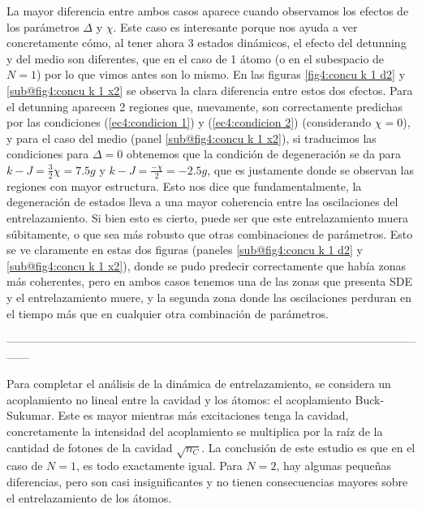 La mayor diferencia entre ambos casos aparece cuando observamos los efectos de los parámetros $\Delta$ y $\chi$. Este caso es interesante porque nos ayuda a ver concretamente cómo, al tener ahora 3 estados dinámicos, el efecto del detunning y del medio son diferentes, que en el caso de 1 átomo (o en el subespacio de $N=1$) por lo que vimos antes son lo mismo. En las figuras \ref{fig4:concu k 1 d2} y \ref{sub@fig4:concu k 1 x2} se observa la clara diferencia entre estos dos efectos. Para el detunning aparecen 2 regiones que, nuevamente, son correctamente predichas por las condiciones (\ref{ec4:condicion 1}) y (\ref{ec4:condicion 2}) (considerando $\chi=0$), y para el caso del medio (panel \ref{sub@fig4:concu k 1 x2}), si traducimos las condiciones para $\Delta=0$ obtenemos que la condición de degeneración se da para $k-J=\frac{3}{2}\chi=7.5g$ y $k-J=\frac{-\chi}{2}=-2.5g$, que es justamente donde se observan las regiones con mayor estructura.
Esto nos dice que fundamentalmente, la degeneración de estados lleva a una mayor coherencia entre las oscilaciones del entrelazamiento. Si bien esto es cierto, puede ser que este entrelazamiento muera súbitamente, o que sea más robusto que otras combinaciones de parámetros. Esto se ve claramente en estas dos figuras (paneles \ref{sub@fig4:concu k 1 d2} y \ref{sub@fig4:concu k 1 x2}), donde se pudo predecir correctamente que había zonas más coherentes, pero en ambos casos tenemos una de las zonas que presenta SDE y el entrelazamiento muere, y la segunda zona donde las oscilaciones perduran en el tiempo más que en cualquier otra combinación de parámetros. 

------------------------------------------------------------------------------------------------------------------



Para completar el análisis de la dinámica de entrelazamiento, se considera un acoplamiento no lineal entre la cavidad y los átomos: el acoplamiento Buck-Sukumar. Este es mayor mientras más excitaciones tenga la cavidad, concretamente la intensidad del acoplamiento se multiplica por la raíz de la cantidad de fotones de la cavidad $\sqrt{n_C}$. 
La conclusión de este estudio es que en el caso de $N=1$, es todo exactamente igual. Para $N=2$, hay algunas pequeñas diferencias, pero son casi insignificantes y no tienen consecuencias mayores sobre el entrelazamiento de los átomos. 

